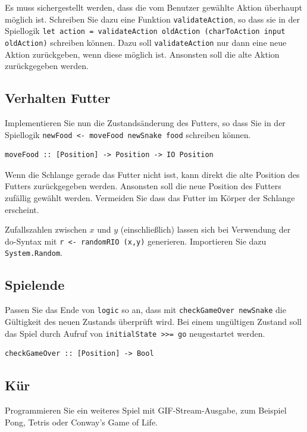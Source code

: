 \documentclass{scrartcl}
\begin{document}
Es muss sichergestellt werden, dass die vom Benutzer gewählte Aktion überhaupt möglich ist.
Schreiben Sie dazu eine Funktion \texttt{validateAction}, so dass sie in der Spiellogik \texttt{let action = validateAction oldAction (charToAction input oldAction)} schreiben können.
Dazu soll \texttt{validateAction} nur dann eine neue Aktion zurückgeben, wenn diese möglich ist.
Ansonsten soll die alte Aktion zurückgegeben werden.


\subsection{Verhalten Futter}
Implementieren Sie nun die Zustandsänderung des Futters, so dass Sie in der Spiellogik \texttt{newFood <- moveFood newSnake food} schreiben können.

\begin{lstlisting}
moveFood :: [Position] -> Position -> IO Position
\end{lstlisting}

Wenn die Schlange gerade das Futter nicht isst, kann direkt die alte Position des Futters zurückgegeben werden.
Ansonsten soll die neue Position des Futters zufällig gewählt werden.
Vermeiden Sie dass das Futter im Körper der Schlange erscheint.

Zufallszahlen zwischen $x$ und $y$ (einschließlich) lassen sich bei Verwendung der do-Syntax mit \texttt{r <- randomRIO (x,y)} generieren.
Importieren Sie dazu \texttt{System.Random}.

\subsection{Spielende}
Passen Sie das Ende von \texttt{logic} so an, dass mit \texttt{checkGameOver newSnake} die Gültigkeit des neuen Zustands überprüft wird.
Bei einem ungültigen Zustand soll das Spiel durch Aufruf von \texttt{initialState >>= go} neugestartet werden.

\begin{lstlisting}
checkGameOver :: [Position] -> Bool
\end{lstlisting}

\subsection{Kür}
Programmieren Sie ein weiteres Spiel mit GIF-Stream-Ausgabe, zum Beispiel Pong, Tetris oder Conway's Game of Life.
\end{document}
